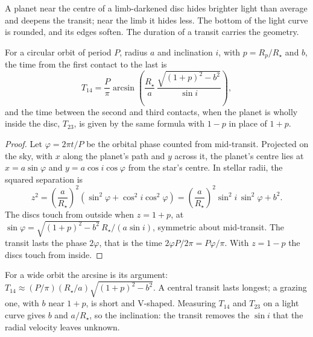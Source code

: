 A planet near the centre of a limb-darkened disc hides brighter light
than average and deepens the transit; near the limb it hides less. The
bottom of the light curve is rounded, and its edges soften. The duration
of a transit carries the geometry.

\begin{theorem}\label{thm:b3:exoplanets:duration}
For a circular orbit of period $P$, radius $a$ and inclination $i$, with
$p = R_p/R_\star$ and  $b$, the time from the first
contact to the last is
\[
T_{14} = \frac{P}{\pi}\arcsin\!\left(\frac{R_\star}{a}\,
          \frac{\sqrt{(1 + p)^2 - b^2}}{\sin i}\right),
\]
and the time between the second and third contacts, when the planet is
wholly inside the disc, $T_{23}$, is given by the same formula with
$1 - p$ in place of $1 + p$.
\end{theorem}

\begin{proof}
Let $\varphi = 2\pi t/P$ be the orbital phase counted from mid-transit.
Projected on the sky, with $x$ along the planet's path and $y$ across it,
the planet's centre lies at $x = a\sin\varphi$ and $y = a\cos i\cos\varphi$
from the star's centre. In stellar radii, the squared separation is
\[
z^2 = \left(\frac{a}{R_\star}\right)^2(\sin^2\varphi + \cos^2 i\cos^2\varphi)
    = \left(\frac{a}{R_\star}\right)^2\sin^2 i\,\sin^2\varphi + b^2 .
\]
The discs touch from outside when $z = 1 + p$, at
$\sin\varphi = \sqrt{(1 + p)^2 - b^2}\,R_\star/(a\sin i)$, symmetric
about mid-transit. The transit lasts the phase $2\varphi$, that is the
time $2\varphi P/2\pi = P\varphi/\pi$. With $z = 1 - p$ the discs touch
from inside.
\end{proof}

For a wide orbit the arcsine is its argument: $T_{14} \approx (P/\pi)
(R_\star/a)\sqrt{(1 + p)^2 - b^2}$. A central transit lasts longest; a
grazing one, with $b$ near $1 + p$, is short and V-shaped. Measuring
$T_{14}$ and $T_{23}$ on a light curve gives $b$ and $a/R_\star$, so the
inclination: the transit removes the $\sin i$ that the radial velocity
leaves unknown.

